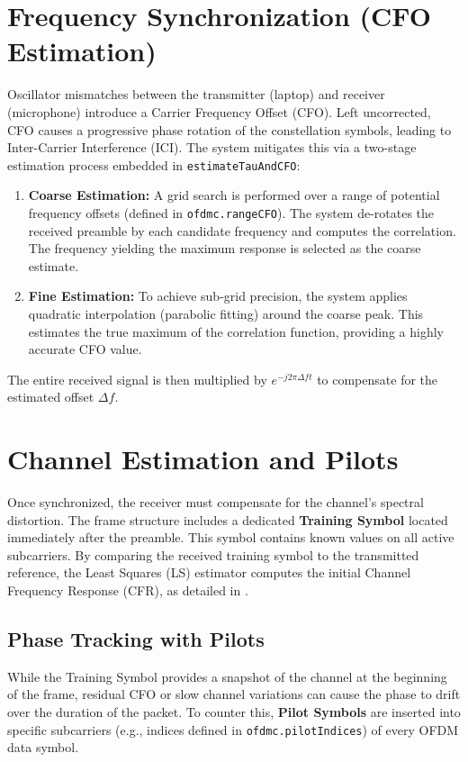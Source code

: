\section{Frequency Synchronization (CFO Estimation)} \label{sec:FreqSync}

Oscillator mismatches between the transmitter (laptop) and receiver (microphone) introduce a Carrier Frequency Offset (CFO).
Left uncorrected, CFO causes a progressive phase rotation of the constellation symbols, leading to Inter-Carrier Interference (ICI).
The system mitigates this via a two-stage estimation process embedded in \texttt{estimateTauAndCFO}:

\begin{enumerate}
    \item \textbf{Coarse Estimation:} A grid search is performed over a range of potential frequency offsets (defined in \texttt{ofdmc.rangeCFO}). The system de-rotates the received preamble by each candidate frequency and computes the correlation. The frequency yielding the maximum response is selected as the coarse estimate.
    \item \textbf{Fine Estimation:} To achieve sub-grid precision, the system applies quadratic interpolation (parabolic fitting) around the coarse peak. This estimates the true maximum of the correlation function, providing a highly accurate CFO value.
\end{enumerate}

The entire received signal is then multiplied by $e^{-j2\pi \Delta f t}$ to compensate for the estimated offset $\Delta f$.

\section{Channel Estimation and Pilots} \label{sec:PilotsTraining}

Once synchronized, the receiver must compensate for the channel's spectral distortion.
The frame structure includes a dedicated \textbf{Training Symbol} located immediately after the preamble.
This symbol contains known values on all active subcarriers.
By comparing the received training symbol to the transmitted reference, the Least Squares (LS) estimator computes the initial Channel Frequency Response (CFR), as detailed in .

\subsection{Phase Tracking with Pilots}
While the Training Symbol provides a snapshot of the channel at the beginning of the frame, residual CFO or slow channel variations can cause the phase to drift over the duration of the packet.
To counter this, \textbf{Pilot Symbols} are inserted into specific subcarriers (e.g., indices defined in \texttt{ofdmc.pilotIndices}) of every OFDM data symbol.

